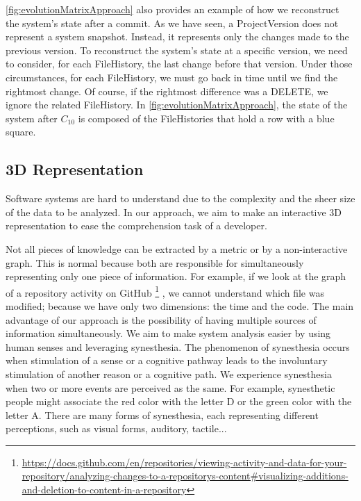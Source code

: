 \autoref{fig:evolutionMatrixApproach} also provides an example of how we reconstruct the system's state after a commit. 
As we have seen, a ProjectVersion does not represent a system snapshot.
Instead, it represents only the changes made to the previous version. 
To reconstruct the system's state at a specific version, we need to consider, for each FileHistory, the last change before that version. 
Under those circumstances, for each FileHistory, we must go back in time until we find the rightmost change. Of course, if the rightmost difference was a DELETE, we ignore the related FileHistory.
In \autoref{fig:evolutionMatrixApproach}, the state of the system after $C_{10}$ is composed of the FileHistories that hold a row with a blue square. 



\subsection{3D Representation}
\label{s:3DRepr}

Software systems are hard to understand due to the complexity and the sheer size of the data to be analyzed.
In our approach, we aim to make an interactive 3D representation to ease the comprehension task of a developer. 

Not all pieces of knowledge can be extracted by a metric or by a non-interactive graph. This is normal because both are responsible for simultaneously representing only one piece of information. For example, if we look at the graph of a repository activity on GitHub 
\footnote{\url{https://docs.github.com/en/repositories/viewing-activity-and-data-for-your-repository/analyzing-changes-to-a-repositorys-content\#visualizing-additions-and-deletion-to-content-in-a-repository}}
, we cannot understand which file was modified; because we have only two dimensions: the time and the code. The main advantage of our approach is the possibility of having multiple sources of information simultaneously. We aim to make system analysis easier by using human senses and leveraging synesthesia. The phenomenon of synesthesia occurs when stimulation of a sense or a cognitive pathway leads to the involuntary stimulation of another reason or a cognitive path. We experience synesthesia when two or more events are perceived as the same. 
For example, synesthetic people might associate the red color with the letter D or the green color with the letter A. 
There are many forms of synesthesia, each representing different perceptions, such as visual forms, auditory, tactile...

